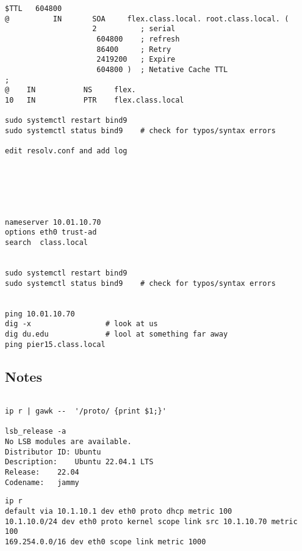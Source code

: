\begin{verbatim}
$TTL   604800
@          IN       SOA     flex.class.local. root.class.local. (
                    2          ; serial  
                     604800    ; refresh
                     86400     ; Retry
                     2419200   ; Expire
                     604800 )  ; Netative Cache TTL
;
@    IN           NS     flex.
10   IN           PTR    flex.class.local

sudo systemctl restart bind9
sudo systemctl status bind9    # check for typos/syntax errors

edit resolv.conf and add log






nameserver 10.01.10.70   
options eth0 trust-ad
search  class.local


sudo systemctl restart bind9
sudo systemctl status bind9    # check for typos/syntax errors


ping 10.01.10.70
dig -x                 # look at us
dig du.edu             # lool at something far away
ping pier15.class.local

\end{verbatim}
\endgroup


\subsection{Notes}



\begingroup \fontsize{10pt}{10pt}
\selectfont
\begin{verbatim} 

ip r | gawk --  '/proto/ {print $1;}'

lsb_release -a
No LSB modules are available.
Distributor ID:	Ubuntu
Description:	Ubuntu 22.04.1 LTS
Release:	22.04
Codename:	jammy
\end{verbatim}
\endgroup

\begingroup \fontsize{10pt}{10pt}
\selectfont
\begin{verbatim} 
ip r
default via 10.1.10.1 dev eth0 proto dhcp metric 100 
10.1.10.0/24 dev eth0 proto kernel scope link src 10.1.10.70 metric 100 
169.254.0.0/16 dev eth0 scope link metric 1000 
\end{verbatim}
\endgroup



